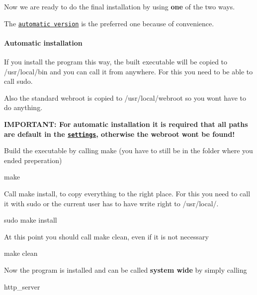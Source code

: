 Now we are ready to do the final installation by using {\bfseries one} of the two ways.

The \href{#automatic-installation}{\tt automatic version} is the preferred one because of convenience. 



\paragraph*{Automatic installation}

If you install the program this way, the built executable will be copied to /usr/local/bin and you can call it from anywhere. For this you need to be able to call sudo.

Also the standard webroot is copied to /usr/local/webroot so you wont have to do anything.

{\bfseries I\+M\+P\+O\+R\+T\+A\+NT\+: For automatic installation it is required that all paths are default in the \href{#paths}{\tt settings}, otherwise the webroot wont be found!}


\begin{DoxyEnumerate}
\item Build the executable by calling make (you have to still be in the folder where you ended preperation) \begin{DoxyVerb}make
\end{DoxyVerb}

\item Call make install, to copy everything to the right place. For this you need to call it with sudo or the current user has to have write right to /usr/local/. \begin{DoxyVerb}sudo make install
\end{DoxyVerb}

\item At this point you should call make clean, even if it is not necessary \begin{DoxyVerb}make clean
\end{DoxyVerb}

\item Now the program is installed and can be called {\bfseries system wide} by simply calling \begin{DoxyVerb}http_server
\end{DoxyVerb}

\end{DoxyEnumerate}





